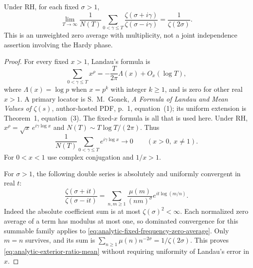 \begin{lemma}
\label{lem:analytic-exterior-phase-average}
Under RH, for each fixed $\sigma>1$,
\begin{equation}\label{eq:analytic-exterior-ratio-mean}
 \lim_{T\to\infty}\frac1{N(T)}
       \sum_{0<\gamma\le T}
       \frac{\zeta(\sigma+i\gamma)}
            {\zeta(\sigma-i\gamma)}
                     =\frac1{\zeta(2\sigma)}.
\end{equation}
This is an unweighted zero average with multiplicity, not a
joint independence assertion involving the Hardy phase.
\end{lemma}

\begin{proof}
For every fixed $x>1$, Landau's formula is
\[
 \sum_{0<\gamma\le T}x^\rho
      =-\frac{T}{2\pi}\Lambda(x)+O_x(\log T),
\]
where $\Lambda(x)=\log p$ when $x=p^k$ with integer $k\ge1$,
and is zero for other real $x>1$. A primary locator is
S.~M.~Gonek, \emph{A Formula of Landau and Mean Values of
$\zeta(s)$}, author-hosted PDF, p.~1, equation~(1);
its uniform extension is Theorem~1, equation~(3).
The fixed-$x$ formula is all that is used here.
Under RH, $x^\rho=\sqrt x\,e^{i\gamma\log x}$ and
$N(T)\sim T\log T/(2\pi)$. Thus
\begin{equation}\label{eq:analytic-fixed-frequency-zero-average}
 \frac1{N(T)}\sum_{0<\gamma\le T}e^{i\gamma\log x}\longrightarrow0
                    \qquad(x>0,\ x\ne1).
\end{equation}
For $0<x<1$ use complex conjugation and $1/x>1$.

For $\sigma>1$, the following double series is absolutely and
uniformly convergent in real $t$:
\[
 \frac{\zeta(\sigma+it)}{\zeta(\sigma-it)}
 =\sum_{n,m\ge1}\frac{\mu(m)}{(nm)^\sigma}
                                  e^{it\log(m/n)}.
\]
Indeed the absolute coefficient sum is at most
$\zeta(\sigma)^2<\infty$. Each normalized zero average of a
term has modulus at most one, so dominated convergence for
this summable family applies to
\eqref{eq:analytic-fixed-frequency-zero-average}.
Only $m=n$ survives, and its sum is
$\sum_{n\ge1}\mu(n)n^{-2\sigma}=1/\zeta(2\sigma)$.
This proves \eqref{eq:analytic-exterior-ratio-mean} without
requiring uniformity of Landau's error in $x$.
\end{proof}

